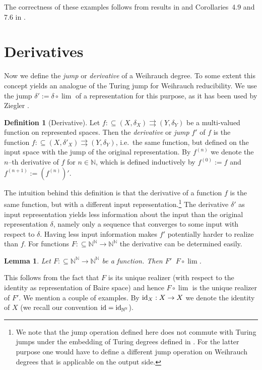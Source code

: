 \documentclass[a4paper]{amsart}
\def\IN{{\mathbb{N}}}
\def\In{\subseteq}
\def\mto{\rightrightarrows}
\def\id{{\rm id}}
\def\Baire{{\IN^\IN}}
\def\equivSW{\mathop{\equiv_{\mathrm{sW}}}}
\newtheorem{lemma}[theorem]{Lemma}
\theoremstyle{definition}
\newtheorem{definition}[theorem]{Definition}
\begin{document}
The correctness of these examples follows from results in \cite{BG11} and Corollaries~4.9 and 7.6 in \cite{BBP}. 


\section{Derivatives}

Now we define the {\em jump} or {\em derivative} of a Weihrauch degree. 
To some extent this concept yields an analogue of the Turing jump for Weihrauch reducibility.
We use the jump $\delta':=\delta\circ\lim$ of a representation for this purpose, as 
it has been used by Ziegler \cite{Zie07}.

\begin{definition}[Derivative]
Let $f:\In (X,\delta_X)\mto (Y,\delta_Y)$ be a multi-valued function on represented spaces. 
Then the {\em derivative} or {\em jump} $f'$ of $f$ is the function $f:\In (X,\delta'_X)\mto(Y,\delta_Y)$,
i.e.\ the same function, but defined on the input space with the jump of the original representation.
By $f^{(n)}$ we denote the $n$--th derivative of $f$ for $n\in\IN$, which is defined inductively by $f^{(0)}:=f$
and $f^{(n+1)}:=(f^{(n)})'$.
\end{definition}

The intuition behind this definition is that the derivative of a function $f$ is the same function,
but with a different input representation.\footnote{We note that
the jump operation defined here does not commute with Turing jumps under the embedding of Turing degrees defined in \cite{BG11}.
For the latter purpose one would have to define a different jump operation on Weihrauch degrees that is applicable on the output side.}
The derivative $\delta'$ as input representation yields
less information about the input than the original representation $\delta$, namely only a sequence
that converges to some input with respect to $\delta$. 
Having less input information makes $f'$ potentially harder to realize than $f$.
For functions $F:\In\Baire\to\Baire$ the derivative can be determined easily.

\begin{lemma}
\label{lem:derivative-Baire}
Let $F:\In\Baire\to\Baire$ be a function. Then $F'\equivSW F\circ\lim$.
\end{lemma}

This follows from the fact that $F$ is its unique realizer (with respect to the
identity as representation of Baire space) and hence $F\circ\lim$ is the unique
realizer of $F'$. We mention a couple of examples.
By $\id_X:X\to X$ we denote
the identity of $X$ (we recall our convention $\id=\id_\Baire$).
\end{document}
